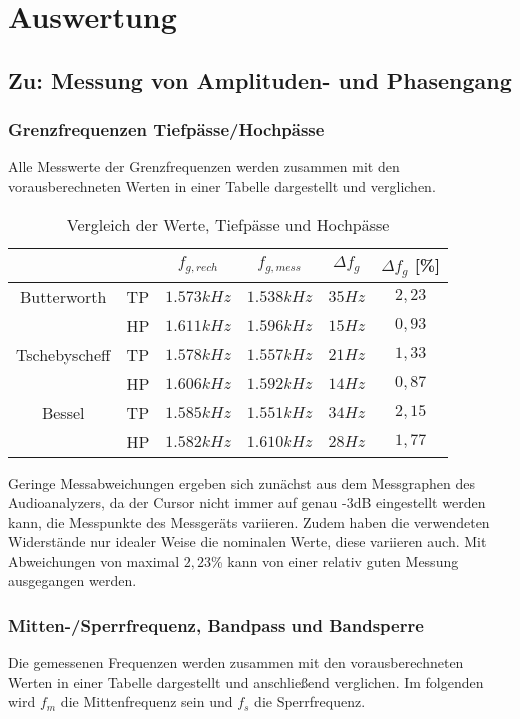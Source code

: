 \section{Auswertung}
\subsection{Zu: Messung von Amplituden- und Phasengang}
\subsubsection{Grenzfrequenzen Tiefpässe/Hochpässe}
\noindent Alle Messwerte der Grenzfrequenzen werden zusammen mit den vorausberechneten Werten in einer Tabelle dargestellt und verglichen.
   	  
   	  \begin{table}[h]
   	  	\centering
   	  	\begin{tabular}{c|c|c|c|c|c|}
						   	&	& $f_{g,rech}$	& $f_{g,mess}$	& $\Delta f_g$	& $\Delta f_g$ [\%] \\
   	  		\hline
   	  		Butterworth		& TP& $1.573kHz$	& $1.538kHz$	& $35Hz$		& $2,23$\\
							& HP& $1.611kHz$	& $1.596kHz$	& $15Hz$		& $0,93$\\
			\hline
   	  		Tschebyscheff	& TP& $1.578kHz$	& $1.557kHz$	& $21Hz$		& $1,33$\\
				   	  		& HP& $1.606kHz$	& $1.592kHz$	& $14Hz$		& $0,87$\\
   	  		\hline
   	  		Bessel			& TP& $1.585kHz$	& $1.551kHz$	& $34Hz$		& $2,15$\\
				   	  		& HP& $1.582kHz$	& $1.610kHz$	& $28Hz$		& $1,77$
   	  	\end{tabular}
		\caption{Vergleich der Werte, Tiefpässe und Hochpässe}
		\label{tab:grenzfrequnzen_hp_tp_vorausberechnung}
   	  \end{table}
   	  
   	  \noindent Geringe Messabweichungen ergeben sich zunächst aus dem Messgraphen des Audioanalyzers, da der Cursor nicht immer auf genau -3dB eingestellt werden kann, die Messpunkte des Messgeräts variieren. Zudem haben die verwendeten Widerstände nur idealer Weise die nominalen Werte, diese variieren auch. Mit Abweichungen von maximal $2,23$\% kann von einer relativ guten Messung ausgegangen werden.
   	  

\subsubsection{Mitten-/Sperrfrequenz, Bandpass und Bandsperre}
\noindent Die gemessenen Frequenzen werden zusammen mit den vorausberechneten Werten in einer Tabelle dargestellt und anschließend verglichen. Im folgenden wird $f_m$ die Mittenfrequenz sein und $f_s$ die Sperrfrequenz.

